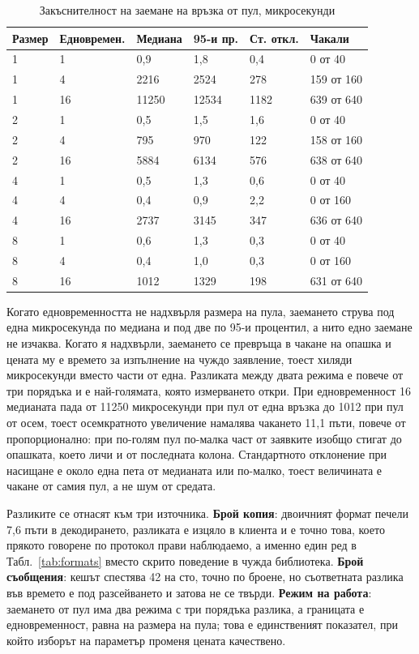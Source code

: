 \begin{table}[H]
\centering
\caption{Закъснителност на заемане на връзка от пул, микросекунди}
\label{tab:pool}
\begin{tabular}{L{1.8cm}L{2.2cm}L{2.0cm}L{2.0cm}L{2.0cm}L{2.2cm}}
\toprule
\textbf{Размер} & \textbf{Едновремен.} & \textbf{Медиана} & \textbf{95-и пр.} & \textbf{Ст. откл.} & \textbf{Чакали} \\
 & 1  & 0,9   & 1,8   & 0,4  & 0 от 40 \\
1 & 4  & 2216  & 2524  & 278  & 159 от 160 \\
1 & 16 & 11250 & 12534 & 1182 & 639 от 640 \\
2 & 1  & 0,5   & 1,5   & 1,6  & 0 от 40 \\
2 & 4  & 795   & 970   & 122  & 158 от 160 \\
2 & 16 & 5884  & 6134  & 576  & 638 от 640 \\
4 & 1  & 0,5   & 1,3   & 0,6  & 0 от 40 \\
4 & 4  & 0,4   & 0,9   & 2,2  & 0 от 160 \\
4 & 16 & 2737  & 3145  & 347  & 636 от 640 \\
8 & 1  & 0,6   & 1,3   & 0,3  & 0 от 40 \\
8 & 4  & 0,4   & 1,0   & 0,3  & 0 от 160 \\
8 & 16 & 1012  & 1329  & 198  & 631 от 640 \\
\bottomrule
\end{tabular}
\end{table}

Когато едновременността не надхвърля размера на пула, заемането струва под една микросекунда
по медиана и под две по 95-и процентил, а нито едно заемане не изчаква. Когато я надхвърли,
заемането се превръща в чакане на опашка и цената му е времето за изпълнение на чуждо
заявление, тоест хиляди микросекунди вместо части от една. Разликата между двата режима е
повече от три порядъка и е най-голямата, която измерването откри. При едновременност 16
медианата пада от 11250 микросекунди при пул от една връзка до 1012 при пул от осем, тоест
осемкратното увеличение намалява чакането 11,1 пъти, повече от пропорционално: при по-голям
пул по-малка част от заявките изобщо стигат до опашката, което личи и от последната колона.
Стандартното отклонение при насищане е около една пета от медианата или по-малко, тоест
величината е чакане от самия пул, а не шум от средата.

Разликите се отнасят към три източника. \textbf{Брой копия}: двоичният формат печели 7,6 пъти
в декодирането, разликата е изцяло в клиента и е точно това, което прякото говорене по
протокол прави наблюдаемо, а именно един ред в Табл.~\ref{tab:formats} вместо скрито
поведение в чужда библиотека. \textbf{Брой съобщения}: кешът спестява 42 на сто, точно по
броене, но съответната разлика във времето е под разсейването и затова не се твърди.
\textbf{Режим на работа}: заемането от пул има два режима с три порядъка разлика, а границата
е едновременност, равна на размера на пула; това е единственият показател, при който изборът
на параметър променя цената качествено.

